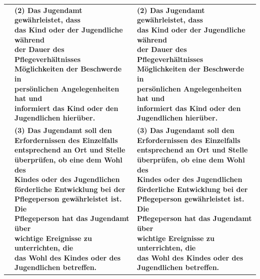 \documentclass[10pt,a4paper,landscape]{article}
\begin{document}
\begin{longtable}{|L{8.2cm}|L{8.2cm}|L{8.2cm}|}
 & \textbf{(2) Das Jugendamt gewährleistet, dass  \newline das Kind oder der Jugendliche während  \newline der Dauer des Pflegeverhältnisses  \newline Möglichkeiten der Beschwerde in  \newline persönlichen Angelegenheiten hat und  \newline informiert das Kind oder den  \newline Jugendlichen hierüber. } & \textbf{(2) Das Jugendamt gewährleistet, dass  \newline das Kind oder der Jugendliche während  \newline der Dauer des Pflegeverhältnisses  \newline Möglichkeiten der Beschwerde in  \newline persönlichen Angelegenheiten hat und  \newline informiert das Kind oder den  \newline Jugendlichen hierüber. } \\
\hhline{|---|}
 & \textbf{(3) Das Jugendamt soll den  \newline Erfordernissen des Einzelfalls  \newline entsprechend an Ort und Stelle  \newline überprüfen, ob eine dem Wohl des  \newline Kindes oder des Jugendlichen  \newline förderliche Entwicklung bei der  \newline Pflegeperson gewährleistet ist. Die  \newline Pflegeperson hat das Jugendamt über  \newline wichtige Ereignisse zu unterrichten, die  \newline das Wohl des Kindes oder des  \newline Jugendlichen betreffen. } & \textbf{(3) Das Jugendamt soll den  \newline Erfordernissen des Einzelfalls  \newline entsprechend an Ort und Stelle  \newline überprüfen, ob eine dem Wohl des  \newline Kindes oder des Jugendlichen  \newline förderliche Entwicklung bei der  \newline Pflegeperson gewährleistet ist. Die  \newline Pflegeperson hat das Jugendamt über  \newline wichtige Ereignisse zu unterrichten, die  \newline das Wohl des Kindes oder des  \newline Jugendlichen betreffen. } \\

\end{longtable}
\end{document}
